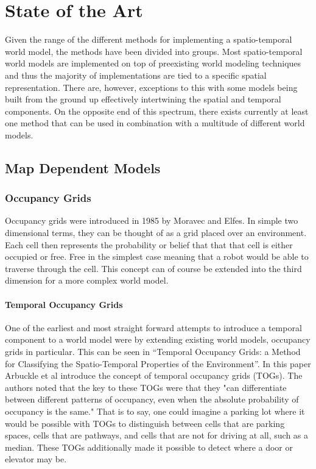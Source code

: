 
  \chapter{ State of the Art }

  Given the range of the different methods for implementing a spatio-temporal
  world model, the methods have been divided into groups.  Most spatio-temporal
  world models are implemented on top of preexisting world modeling techniques
  and thus the majority of implementations are tied to a specific spatial
  representation. There are, however, exceptions to this with some models being
  built from the ground up effectively intertwining the spatial and temporal
  components. On the opposite end of this spectrum, there exists currently at
  least one method that can be used in combination with a multitude of different
  world models.


  \section{ Map Dependent Models }

  \subsection{ Occupancy Grids }

  Occupancy grids were introduced in 1985 by Moravec and Elfes. \cite{Elfes1985}
  In simple two dimensional terms, they can be thought of as a grid placed
  over an environment. Each cell then represents the probability or belief that
  that that cell is either occupied or free. Free in the simplest case meaning
  that a robot would be able to traverse through the cell. This concept can of
  course be extended into the third dimension for a more complex world model. \\

  \subsubsection{ Temporal Occupancy Grids }
  One of the earliest and most straight forward attempts to introduce a temporal
  component to a world model were by extending existing world models, occupancy
  grids in particular. This can be seen in ``Temporal Occupancy Grids: a Method for
  Classifying the Spatio-Temporal Properties of the Environment''.
  \cite{Arbuckle2002} In this paper Arbuckle et al introduce the concept of
  temporal occupancy grids (TOGs). The authors noted that the key to these TOGs
  were that they "can differentiate between different patterns of occupancy, even
  when the absolute probability of occupancy is the same." That is to say, one
  could imagine a parking lot where it would be possible with TOGs to distinguish
  between cells that are parking spaces, cells that are pathways, and cells that
  are not for driving at all, such as a median. These TOGs additionally made it
  possible to detect where a door or elevator may be. \\

